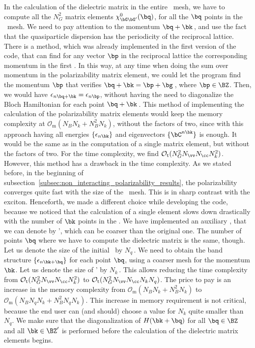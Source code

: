 In the calculation of the dielectric matrix in the entire \bz~mesh, we have to compute all the $N_{G}^2$ matrix elements $\chi^0_{\bG \bG'}(\bq)$, for all the $\bq$ points in the \bz~mesh.
We need to pay attention to the momentum $\bq + \bk$\,, and use the fact that the quasiparticle dispersion has the periodicity of the reciprocal lattice.
There is a method, which was already implemented in the first version of the code, that can find for any vector $\bp$ in the reciprocal lattice the corresponding momentum in the first \bz\@.
In this way, at any time when doing the sum over momentum in the polarizability matrix element, we could let the program find the momentum $\bp$ that verifies $\bq + \bk = \bp + \bg$\,, where $\bp \in \BZ$\@.
Then, we would have $\epsilon_{n \bq+\bk} = \epsilon_{n \bp}$, without having the need to diagonalize the Bloch Hamiltonian for each point $\bq+\bk$\,.
This method of implementing the calculation of the polarizability matrix elements would keep the memory complexity at $\mathcal{O}_{\mathrm{m}}(N_{B} N_{k} + N_{B}^2 N_{k})$, without the factors of two, since with this approach having all energies $\{\epsilon_{n \bk}\}$ and eigenvectors $\{\bC^{n \bk}\}$ is enough.
It would be the same as in the computation of a single matrix element, but without the factors of two.
For the time complexity, we find $\mathcal{O}_{\mathrm{t}} (N_{G}^2 N_{\vv} N_{\cc} N_{k}^2)$.
However, this method has a drawback in the time complexity.
As we stated before, in the beginning of subsection~\ref{subsec:non_interacting_polarizability_results}, the polarizability converges quite fast with the size of the \bz~mesh.
This is in sharp contrast with the exciton.
Henceforth, we made a different choice while developing the code, because we noticed that the calculation of a single element slows down drastically with the number of $\bk$ points in the \bz\@.
We have implemented an auxiliary \bz, that we can denote by \bz', which can be coarser than the original one.
The number of points $\bq$ where we have to compute the dielectric matrix is the same, though.
Let us denote the size of the initial \bz~by $N_q$\,.
We need to obtain the band structure $\{\epsilon_{n \bk + \bq}\}$ for each point $\bq$, using a coarser mesh for the momentum $\bk$.
Let us denote the size of \bz' by $N_k$\,.
This allows reducing the time complexity from $\mathcal{O}_{\mathrm{t}} (N_{G}^2 N_{\vv} N_{\cc} N_{k}^2)$ to $\mathcal{O}_{\mathrm{t}} (N_{G}^2 N_{\vv} N_{\cc} N_{k} N_{q})$.
The price to pay is an increase in the memory complexity from $\mathcal{O}_{\mathrm{m}}(N_{B} N_{k} + N_{B}^2 N_{k})$ to $\mathcal{O}_{\mathrm{m}}(N_{B} N_{q} N_{k} + N_{B}^2 N_{q} N_{k})$.
This increase in memory requirement is not critical, because the end user can (and should) choose a value for $N_{k}$ quite smaller than $N_{q}$.
We make sure that the diagonalization of $H(\bk + \bq)$ for all $\bq \in \BZ$ and all $\bk \in \BZ'$ is performed before the calculation of the dielectric matrix elements begins.

